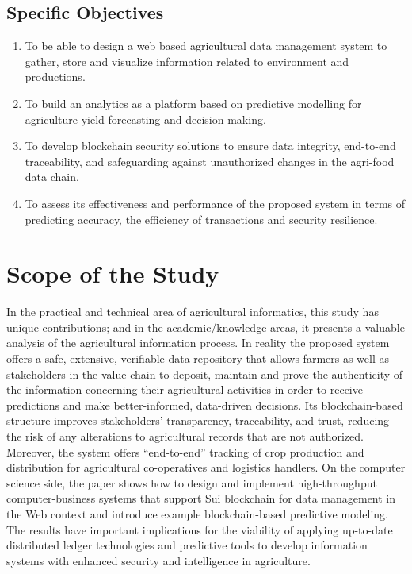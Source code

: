 \subsection{Specific Objectives}
\begin{enumerate}[label=(\roman*)]
    \item To be able to design a web based agricultural data management system to gather, store and visualize information related to environment and productions.
    \item To build an analytics as a platform based on predictive modelling for agriculture yield forecasting and decision making.
    \item To develop blockchain security solutions to ensure data integrity, end-to-end traceability, and safeguarding against unauthorized changes in the agri-food data chain.
    \item To assess its effectiveness and performance of the proposed system in terms of predicting accuracy, the efficiency of transactions and security resilience.
\end{enumerate}

\section{Scope of the Study}

In the practical and technical area of agricultural informatics, this study has unique contributions; and in the academic/knowledge areas, it presents a valuable analysis of the agricultural information process. In reality the proposed system offers a safe, extensive, verifiable data repository that allows farmers as well as stakeholders in the value chain to deposit, maintain and prove the authenticity of the information concerning their agricultural activities in order to receive predictions and make better-informed, data-driven decisions. Its blockchain-based structure improves stakeholders' transparency, traceability, and trust, reducing the risk of any alterations to agricultural records that are not authorized. Moreover, the system offers ``end-to-end'' tracking of crop production and distribution for agricultural co-operatives and logistics handlers. On the computer science side, the paper shows how to design and implement high-throughput computer-business systems that support Sui blockchain for data management in the Web context and introduce example blockchain-based predictive modeling. The results have important implications for the viability of applying up-to-date distributed ledger technologies and predictive tools to develop information systems with enhanced security and intelligence in agriculture.

